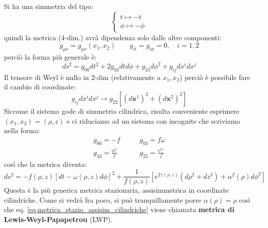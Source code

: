 Si ha una simmetria del tipo:
\begin{equation*}
    \left\{\begin{array}{c}
         t\mapsto -t \\
         \phi \mapsto -\phi
     \end{array}\right.
\end{equation*}
quindi la metrica (4-dim.) avrà dipendenza solo dalle altre componenti:
\begin{equation*}
    g_{\mu\nu}=g_{\mu\nu}(x_1,x_2) \qquad g_{it}=g_{i\phi} = 0 ,\quad i=1,2
\end{equation*}
perciò la forma più generale è:
\begin{equation}
    ds^2 = g_{00}dt^2 + 2g_{03}dtd\phi + g_{33}d\phi^2 + g_{ij}dx^i dx^j
    \label{eq.metrica_stazio_assisim_generale}
\end{equation}
Il tensore di Weyl è nullo in 2-dim (relativamente a $x_1, x_2$) perciò è possibile fare il cambio di coordinate:
\begin{equation*}
    g_{ij}dx^i dx^j \rightarrow g_{22}\left[ (d\bm{x}^1)^2 + (d\bm{x}^2)^2\right]
\end{equation*}
Siccome il sistema gode di simmetria cilindrica, risulta conveniente esprimere $(x_1, x_2) = (\rho, z)$ e ci riduciamo ad un sistema con incognite che scriviamo nella forma:
\begin{align*}
         g_{00} = -f \qquad& g_{03} =f\omega  \\
         g_{33} = \frac{\alpha^2}{f} \qquad& g_{22} = \frac{e^{2\gamma}}{f} 
\end{align*}
così che la metrica diventa:
\begin{equation}
    ds^2 = - f(\rho,z) \left[ dt - \omega(\rho, z) d\phi\right]^2 + \frac{1}{f(\rho,z)}\left[ e^{2\gamma(\rho, z)}(d\rho^2 + dz^2) + \alpha^2(\rho) d\phi^2 \right]
    \label{eq.metrica_stazio_assisim_cilindriche}
\end{equation}
Questa è la più generica metrica stazionaria, assisimmetrica in coordinate cilindriche. Come si vedrà fra poco, si può tranquillamente porre $\alpha(\rho) = \rho$ così che eq. \ref{eq.metrica_stazio_assisim_cilindriche} viene chiamata \textbf{metrica di Lewis-Weyl-Papapetrou} (LWP).

